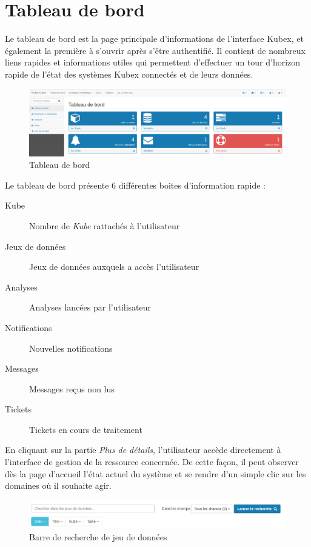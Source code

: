 \documentclass[a4paper]{report}
\begin{document}
\section{Tableau de bord}
\label{sec:dashboard}
Le tableau de bord est la page principale d'informations de l'interface Kubex, et également la première à s'ouvrir après s'être authentifié. Il contient de nombreux liens rapides et informations utiles qui permettent d'effectuer un tour d'horizon rapide de l'état des systèmes Kubex connectés et de leurs données.

\begin{figure}[h]
	\includegraphics[width=\textwidth]{images/dashboard.png}
	\caption{\label{fig:dashboard} Tableau de bord}
\end{figure}

Le tableau de bord présente 6 différentes boites d'information rapide :

\begin{description}
	\item[Kube] Nombre de \emph{Kube} rattachés à l'utilisateur
	\item[Jeux de données] Jeux de données auxquels a accès l'utilisateur
	\item[Analyses] Analyses lancées par l'utilisateur
	\item[Notifications] Nouvelles notifications
	\item[Messages] Messages reçus non lus
	\item[Tickets] Tickets en cours de traitement
\end{description}

En cliquant sur la partie \emph{Plus de détails}, l'utilisateur accède directement à l'interface de gestion de la ressource concernée. De cette façon, il peut observer dès la page d'accueil l'état actuel du système et se rendre d'un simple clic sur les domaines où il souhaite agir.

\begin{figure}[h]
	\includegraphics[width=\textwidth]{images/searchBar.png}
	\caption{\label{fig:search} Barre de recherche de jeu de données}
\end{figure}
\end{document}
